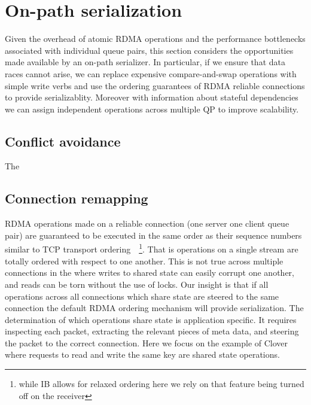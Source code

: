 \section{On-path serialization}

Given the overhead of atomic RDMA operations and the performance bottlenecks
associated with individual queue pairs, this section considers the opportunities
made available by an on-path serializer.  In particular, if we ensure that data
races cannot arise, we can replace expensive compare-and-swap operations with
simple write verbs and use the ordering guarantees of RDMA reliable connections
to provide serializablity. Moreover with information about stateful dependencies
we can assign independent operations across multiple QP to improve scalability.

\subsection{Conflict avoidance}

The

\subsection{Connection remapping}

RDMA operations made on a reliable connection (one server one client queue pair)
are guaranteed to be executed in the same order as their sequence numbers
similar to TCP transport ordering~\cite{infiniband-spec}~\footnote{while IB
allows for relaxed ordering here we rely on that feature being turned off on the
receiver}. That is operations on a single stream are totally ordered with
respect to one another. This is not true across multiple connections in the
where writes to shared state can easily corrupt one another, and reads can be
torn without the use of locks.  Our insight is that if all operations across all
connections which share state are steered to the same connection the default
RDMA ordering mechanism will provide serialization.  The determination of which
operations share state is application specific. It requires inspecting each
packet, extracting the relevant pieces of meta data, and steering the packet to
the correct connection. Here we focus on the example of Clover where requests to
read and write the same key are shared state operations.


